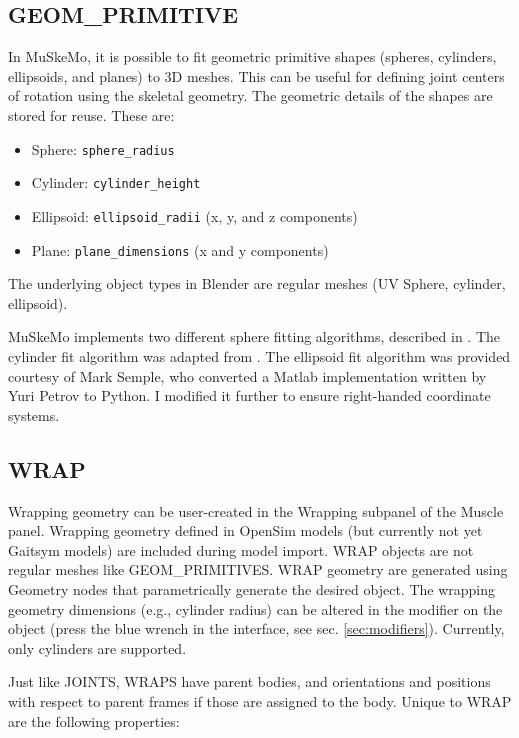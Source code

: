 \documentclass{article}
\begin{document}
\subsection{GEOM\_PRIMITIVE}

In MuSkeMo, it is possible to fit geometric primitive shapes (spheres, cylinders, ellipsoids, and planes) to 3D meshes. This can be useful for defining joint centers of rotation using the skeletal geometry. The geometric details of the shapes are stored for reuse. These are:

\begin{itemize}
    \item Sphere: \texttt{sphere\_radius}
    \item Cylinder: \texttt{cylinder\_height}
    \item Ellipsoid: \texttt{ellipsoid\_radii} (x, y, and z components)
    \item Plane: \texttt{plane\_dimensions} (x and y components)
\end{itemize}

The underlying object types in Blender are regular meshes (UV Sphere, cylinder, ellipsoid).

MuSkeMo implements two different sphere fitting algorithms, described in \cite{Jekel2016, yesudasanFastGeometricFit2015}. The cylinder fit algorithm was adapted from \cite{eberlyLeastSquaresFitting}. The ellipsoid fit algorithm \cite{semplePyEllipsoid_Fit} was provided courtesy of Mark Semple, who converted a Matlab implementation written by Yuri Petrov to Python. I modified it further to ensure right-handed coordinate systems.

\subsection{WRAP}
\label{sec:wrapgeom}

Wrapping geometry can be user-created in the Wrapping subpanel of the Muscle panel. Wrapping geometry defined in OpenSim models (but currently not yet Gaitsym models) are included during model import. WRAP objects are not regular meshes like GEOM\_PRIMITIVES. WRAP geometry are generated using Geometry nodes that parametrically generate the desired object. The wrapping geometry dimensions (e.g., cylinder radius) can be altered in the modifier on the object (press the blue wrench in the interface, see sec. \ref{sec:modifiers}). Currently, only cylinders are supported.

Just like JOINTS, WRAPS have parent bodies, and orientations and positions with respect to parent frames if those are assigned to the body. Unique to WRAP are the following properties:
\end{document}
